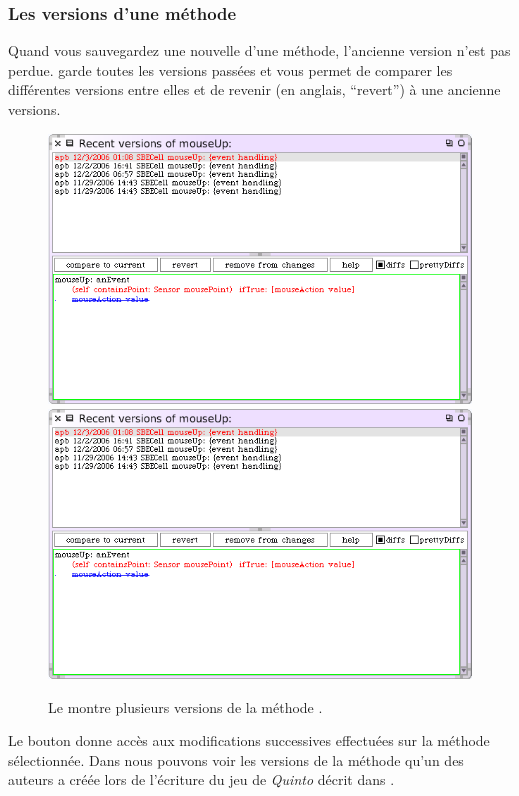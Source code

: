 \documentclass[a4paper,10pt,twoside]{book}
\begin{document}
\subsubsection{Les versions d'une m\'ethode}
\label{sec:versions}

Quand vous sauvegardez une nouvelle  d'une m\'ethode,
l'ancienne version n'est pas perdue. \sq garde toutes les versions pass\'ees et vous permet de comparer les diff\'erentes versions entre elles et de revenir (en anglais, ``revert'') \`a une ancienne versions.
\begin{figure}[btp]
   \centering
   \ifluluelse
	   {\includegraphics[width=\textwidth]{VersionsOfMouseUp} }
	   {\includegraphics[scale=0.7]{VersionsOfMouseUp} }
   \caption{Le  montre plusieurs versions de la m\'ethode .}
   \label{fig:mouseUpVersions}
\end{figure}
Le bouton  donne acc\`es aux modifications successives
effectu\'ees sur la m\'ethode s\'electionn\'ee.
Dans  nous pouvons voir les versions de la m\'ethode  qu'un des auteurs a cr\'e\'ee lors de l'\'ecriture du jeu de \emph{Quinto} d\'ecrit dans .
\end{document}
